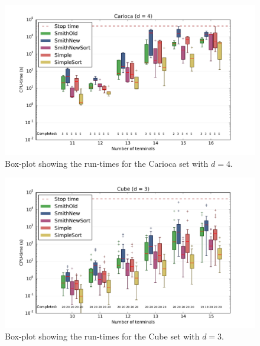 \begin{figure}[htbp]
  \centering
  \includegraphics[width=\textwidth]{gfx/boxplots/plot_nvst_boxplot_d4_Carioca_1}
  \caption[Box-plot for Carioca with $d = 4$]{Box-plot showing the run-times for
    the Carioca set with $d = 4$.\label{fig:boxplot-carioca-d4}}
\end{figure}

\begin{figure}[htbp]
  \centering
  \includegraphics[width=\textwidth]{gfx/boxplots/plot_nvst_boxplot_d3_Cube_1}
  \caption[Box-plot for Cube with $d = 3$]{Box-plot showing the run-times for
    the Cube set with $d = 3$.\label{fig:boxplot-cube-d3}}
\end{figure}


